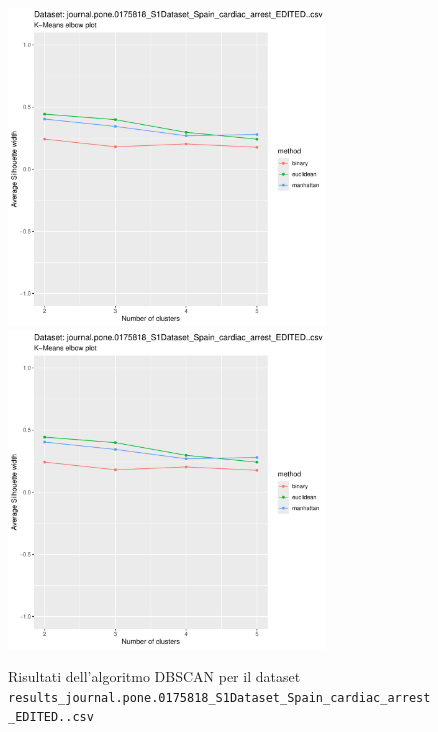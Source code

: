 \documentclass[12pt]{report}
\begin{document}
			\begin{figure}[h]
				\centering
				\includegraphics[width = 0.75\textwidth, height = 0.45\textheight, page = 5]{
					results/results_journal.pone.0175818_S1Dataset_Spain_cardiac_arrest_EDITED..csv.pdf
				}
				\includegraphics[width = 0.75\textwidth, height = 0.45\textheight, page = 6]{
					results/results_journal.pone.0175818_S1Dataset_Spain_cardiac_arrest_EDITED..csv.pdf
				}
				\caption{Risultati dell'algoritmo DBSCAN per il dataset
				\texttt{results\_journal.pone.0175818\_S1Dataset\_Spain\_cardiac\_arrest\_EDITED..csv}}
				\label{fig:dbscan2}
			\end{figure}
\end{document}

